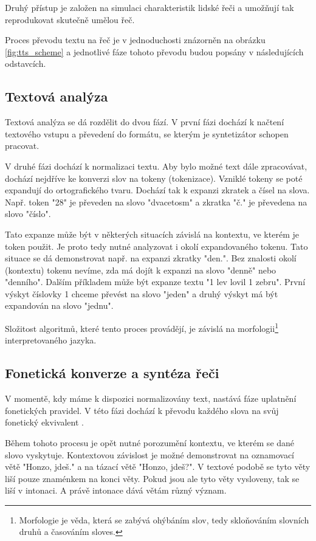\documentclass[ing,male,java,dept460]{diploma}						%
\begin{document}
Druhý přístup je založen na simulaci charakteristik lidské řeči a umožňují tak reprodukovat skutečně umělou řeč.

Proces převodu textu na řeč je v jednoduchosti znázorněn na obrázku \ref{fig:tts_scheme} a jednotlivé fáze tohoto převodu budou popsány v následujících odstavcích.


\subsection{Textová analýza}
Textová analýza se dá rozdělit do dvou fází. V první fázi dochází k načtení textového vstupu a převedení do formátu, se kterým je syntetizátor schopen pracovat.

V druhé fázi dochází k normalizaci textu. Aby bylo možné text dále zpracovávat, dochází nejdříve ke konverzi slov na tokeny (tokenizace). Vzniklé tokeny se poté expandují do ortografického tvaru. Dochází tak k expanzi zkratek a čísel na slova. Např. token "28" je převeden na slovo "dvacetosm" a zkratka "č." je převedena na slovo "číslo".

Tato expanze může být v některých situacích závislá na kontextu, ve kterém je token použit. Je proto tedy nutné analyzovat i okolí expandovaného tokenu. Tato situace se dá demonstrovat např. na expanzi zkratky "den.". Bez znalosti okolí (kontextu) tokenu nevíme, zda má dojít k expanzi na slovo "denně" nebo "denního". Dalším příkladem může být expanze textu "1 lev lovil 1 zebru". První výskyt číslovky 1 chceme převést na slovo "jeden" a druhý výskyt má být expandován na slovo "jednu".

Složitost algoritmů, které tento proces provádějí, je závislá na morfologii\footnote{Morfologie je věda, která se zabývá ohýbáním slov, tedy skloňováním slovních druhů a časováním sloves.} interpretovaného jazyka.

\subsection{Fonetická konverze a syntéza řeči}
V momentě, kdy máme k dispozici normalizovány text, nastává fáze uplatnění fonetických pravidel. V této fázi dochází k převodu každého slova na svůj fonetický ekvivalent \cite{tts_linguatec}.

Během tohoto procesu je opět nutné porozumění kontextu, ve kterém se dané slovo vyskytuje. Kontextovou závislost je možné demonstrovat na oznamovací větě "Honzo, jdeš." a na tázací větě "Honzo, jdeš?". V textové podobě se tyto věty liší pouze znaménkem na konci věty. Pokud jsou ale tyto věty vysloveny, tak se liší v intonaci. A právě intonace dává větám různý význam.
\end{document}
